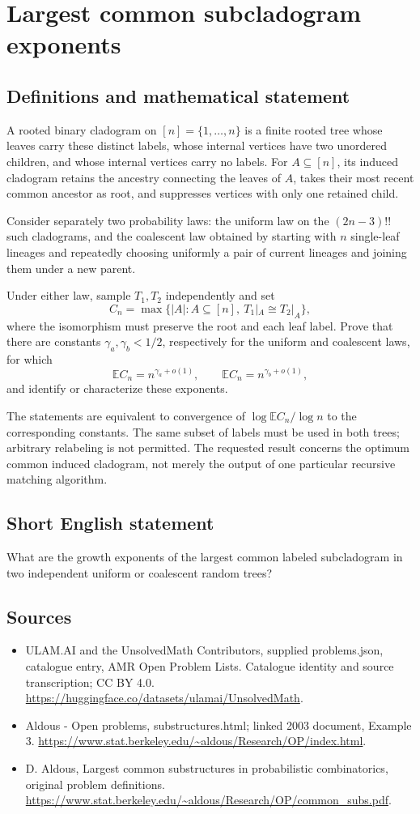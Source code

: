 \documentclass[11pt,a4paper]{article}
\begin{document}
\section*{Largest common subcladogram exponents}\label{statement}

\subsection{Definitions and mathematical statement}
A rooted binary cladogram on $[n]=\{1,\ldots,n\}$ is a finite rooted tree whose leaves carry these distinct labels, whose internal vertices have two unordered children, and whose internal vertices carry no labels. For $A\subseteq[n]$, its induced cladogram retains the ancestry connecting the leaves of $A$, takes their most recent common ancestor as root, and suppresses vertices with only one retained child.

Consider separately two probability laws: the uniform law on the $(2n-3)!!$ such cladograms, and the coalescent law obtained by starting with $n$ single-leaf lineages and repeatedly choosing uniformly a pair of current lineages and joining them under a new parent.

Under either law, sample $T_1,T_2$ independently and set
\[
C_n=\max\{|A|:A\subseteq[n],\ T_1|_A\cong T_2|_A\},
\]
where the isomorphism must preserve the root and each leaf label. Prove that there are constants $\gamma_a,\gamma_b<1/2$, respectively for the uniform and coalescent laws, for which
\[
\mathbb EC_n=n^{\gamma_a+o(1)},\qquad
\mathbb EC_n=n^{\gamma_b+o(1)},
\]
and identify or characterize these exponents.

The statements are equivalent to convergence of $\log\mathbb EC_n/\log n$ to the corresponding constants. The same subset of labels must be used in both trees; arbitrary relabeling is not permitted. The requested result concerns the optimum common induced cladogram, not merely the output of one particular recursive matching algorithm.
\subsection{Short English statement}
What are the growth exponents of the largest common labeled subcladogram in two independent uniform or coalescent random trees?
\subsection{Sources}
\begin{itemize}
\item[S1] ULAM.AI and the UnsolvedMath Contributors, supplied problems.json, catalogue entry, AMR Open Problem Lists. Catalogue identity and source transcription; CC BY 4.0.
\url{https://huggingface.co/datasets/ulamai/UnsolvedMath}.
\item[S2] Aldous - Open problems, substructures.html; linked 2003 document, Example 3. 
\url{https://www.stat.berkeley.edu/~aldous/Research/OP/index.html}.
\item[S3] D. Aldous, Largest common substructures in probabilistic combinatorics, original problem definitions.
\url{https://www.stat.berkeley.edu/~aldous/Research/OP/common_subs.pdf}.
\end{itemize}
\end{document}
